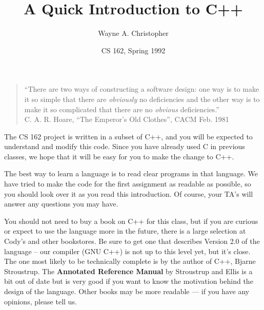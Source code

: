 
\newcommand{\putfig}[3]%
{\begin{figure}%
\centerline{%
\psfig{figure=#1.ps,width=#3}}%
\caption{#2}%
\label{fig:#1}%
\end{figure}}



\title{A Quick Introduction to C++}
\author{Wayne A. Christopher}
\date{CS 162, Spring 1992}



\maketitle

\begin{quote}
``There are two ways of constructing a software design: one way is to
make it so simple that there are {\em obviously} no deficiencies and
the other way is to make it so complicated that there are no {\em
obvious} deficiencies.'' \\ \hbox{} \hfill C. A. R. Hoare, ``The Emperor's
Old Clothes'', CACM Feb. 1981
\end{quote}

The CS 162 project is written in a subset of C++, and you will be
expected to understand and modify this code.  Since you have already
used C in previous classes, we hope that it will be easy for you to
make the change to C++.

The best way to learn a language is to read clear programs in that
language.  We have tried to make the code for the first assignment as
readable as possible, so you should look over it as you read this
introduction.  Of course, your TA's will answer any questions you may
have.

You should not need to buy a book on C++ for this class, but if you
are curious or expect to use the language more in the future, there is
a large selection at Cody's and other bookstores.  Be sure to get one
that describes Version 2.0 of the language -- our compiler (GNU C++)
is not up to this level yet, but it's close.  The one most likely to
be technically complete is by the author of C++, Bjarne Stroustrup.
The {\bf Annotated Reference Manual} by Stroustrup and Ellis is a bit
out of date but is very good if you want to know the motivation behind
the design of the language.  Other books may be more readable --- if
you have any opinions, please tell us.

